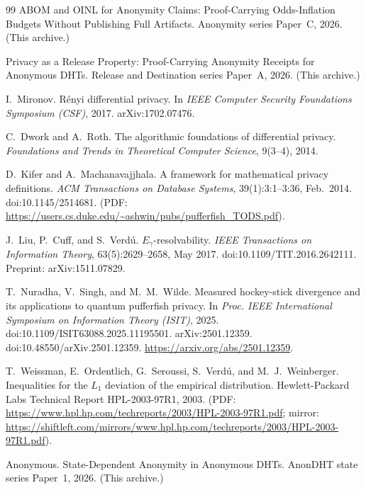 \documentclass[11pt]{article}
\theoremstyle{definition}
\theoremstyle{remark}
\begin{document}
\begin{thebibliography}{99}
ABOM and OINL for Anonymity Claims: Proof-Carrying Odds-Inflation Budgets Without Publishing Full Artifacts.
\newblock Anonymity series Paper~C, 2026. (This archive.)

Privacy as a Release Property: Proof-Carrying Anonymity Receipts for Anonymous DHTs.
\newblock Release and Destination series Paper~A, 2026. (This archive.)


I.~Mironov.
\newblock R\'enyi differential privacy.
\newblock In \emph{IEEE Computer Security Foundations Symposium (CSF)}, 2017. arXiv:1702.07476.

C.~Dwork and A.~Roth.
\newblock The algorithmic foundations of differential privacy.
\newblock \emph{Foundations and Trends in Theoretical Computer Science}, 9(3--4), 2014.

D.~Kifer and A.~Machanavajjhala.
\newblock A framework for mathematical privacy definitions.
\newblock \emph{ACM Transactions on Database Systems}, 39(1):3:1--3:36, Feb.\ 2014.
\newblock doi:10.1145/2514681. (PDF: \url{https://users.cs.duke.edu/~ashwin/pubs/pufferfish_TODS.pdf}).

J.~Liu, P.~Cuff, and S.~Verd\'u.
\newblock $E_\gamma$-resolvability.
\newblock \emph{IEEE Transactions on Information Theory}, 63(5):2629--2658, May 2017.
\newblock doi:10.1109/TIT.2016.2642111. Preprint: arXiv:1511.07829.

T.~Nuradha, V.~Singh, and M.~M.~Wilde.
\newblock Measured hockey-stick divergence and its applications to quantum pufferfish privacy.
\newblock In \emph{Proc. IEEE International Symposium on Information Theory (ISIT)}, 2025.
\newblock doi:10.1109/ISIT63088.2025.11195501. arXiv:2501.12359. doi:10.48550/arXiv.2501.12359.
\newblock \url{https://arxiv.org/abs/2501.12359}.

T.~Weissman, E.~Ordentlich, G.~Seroussi, S.~Verd\'u, and M.~J.~Weinberger.
\newblock Inequalities for the $L_1$ deviation of the empirical distribution.
\newblock Hewlett-Packard Labs Technical Report HPL-2003-97R1, 2003.
\newblock (PDF: \url{https://www.hpl.hp.com/techreports/2003/HPL-2003-97R1.pdf}; mirror: \url{https://shiftleft.com/mirrors/www.hpl.hp.com/techreports/2003/HPL-2003-97R1.pdf}).




Anonymous.
\newblock State-Dependent Anonymity in Anonymous DHTs.
\newblock AnonDHT state series Paper~1, 2026. (This archive.)


\end{thebibliography}
\end{document}
